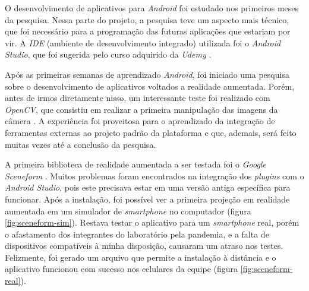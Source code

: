 O desenvolvimento de aplicativos para \textit{Android} foi estudado nos primeiros meses da pesquisa. Nessa parte do projeto, a pesquisa teve um aspecto mais técnico, que foi necessário para a programação das futuras aplicações que estariam por vir. A \textit{IDE} (ambiente de desenvolvimento integrado) utilizada foi o \textit{Android Studio}, que foi sugerida pelo curso adquirido da \textit{Udemy} \cite{udemy}.

Após as primeiras semanas de aprendizado \textit{Android}, foi iniciado uma pesquisa sobre o desenvolvimento de aplicativos voltados a realidade aumentada. Porém, antes de irmos diretamente nisso, um interessante teste foi realizado com \textit{OpenCV},  que consistiu em realizar a primeira manipulação das imagens da câmera \cite{opencv}. A experiência foi proveitosa para o aprendizado da integração de ferramentas externas ao projeto padrão da plataforma e que, ademais, será feito muitas vezes até a conclusão da pesquisa.

A primeira biblioteca de realidade aumentada a ser testada foi o \textit{Google Sceneform} \cite{Sceneform}. Muitos problemas foram encontrados na integração dos \textit{plugins} com o \textit{Android Studio}, pois este precisava estar em uma versão antiga específica para funcionar. Após a instalação, foi possível ver a primeira projeção em realidade aumentada em um simulador de \textit{smartphone} no computador (figura \ref{fig:sceneform-sim}). Restava testar o aplicativo para um \textit{smartphone} real, porém o afastamento dos integrantes do laboratório pela pandemia, e a falta de dispositivos compatíveis à minha disposição, causaram um atraso nos testes. Felizmente, foi gerado um arquivo que permite a instalação à distância e o aplicativo funcionou com sucesso nos celulares da equipe (figura \ref{fig:sceneform-real}).

